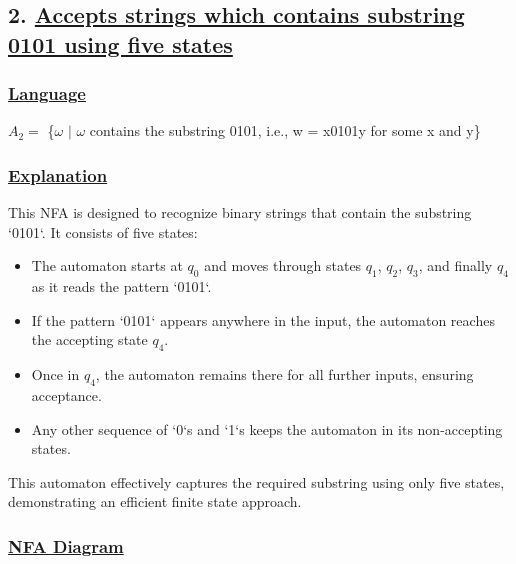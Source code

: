\documentclass[12pt]{article}
\begin{document}
	\newpage
	\subsection*{2. \underline{Accepts strings which contains substring 0101 using five states}}
	\vspace{2mm}
	\subsubsection*{\underline{Language}}
	\begin{tcolorbox}[colback=white,colframe=transitioncol,arc=0mm]
		$A_2 =$ \{$\omega$ $|$ $\omega$ contains the substring 0101, i.e., w = x0101y for some x and y\}
	\end{tcolorbox}
	
	\subsubsection*{\underline{Explanation}}
	This NFA is designed to recognize binary strings that contain the substring `0101`. It consists of five states:
	
	\begin{itemize}
		\item The automaton starts at $q_0$ and moves through states $q_1$, $q_2$, $q_3$, and finally $q_4$ as it reads the pattern `0101`.
		\item If the pattern `0101` appears anywhere in the input, the automaton reaches the accepting state $q_4$.
		\item Once in $q_4$, the automaton remains there for all further inputs, ensuring acceptance.
		\item Any other sequence of `0`s and `1`s keeps the automaton in its non-accepting states.
	\end{itemize}
	This automaton effectively captures the required substring using only five states, demonstrating an efficient finite state approach.
	\subsubsection*{\underline{NFA Diagram}}
	\begin{center}
	\end{center}
	
\end{document}
